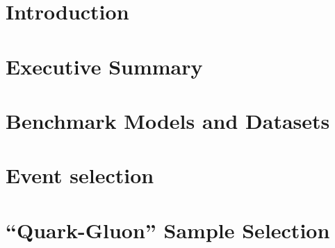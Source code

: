 \documentclass[NOTE, atlasdraft=true, texlive=2020, UKenglish]{atlasdoc}
\begin{document}
\maketitle

\tableofcontents

\clearpage

\section{Introduction}

\clearpage

\section{Executive Summary}

\clearpage

\section{Benchmark Models and Datasets}

\clearpage

\section{Event selection}
\label{sec:event_selection}

\clearpage


\section{``Quark-Gluon'' Sample Selection}

\clearpage
\end{document}
